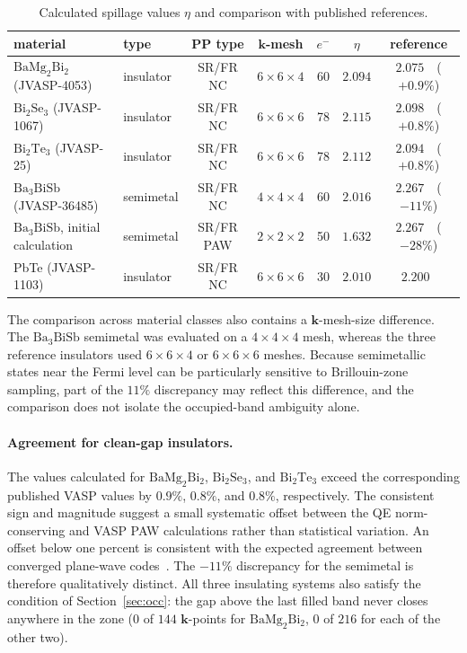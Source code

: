 \documentclass[11pt]{article}
\newcommand{\kk}{\mathbf{k}}
\newcommand{\bmb}{\mathrm{BaMg_2Bi_2}}
\newcommand{\bath}{\mathrm{Ba_3BiSb}}
\begin{document}
\begin{table}[htbp]
\centering
\caption{Calculated spillage values $\eta$ and comparison with published references.}\label{tab:materials}
\setlength{\tabcolsep}{5pt}
\begin{tabular}{@{}llccccc@{}}
\toprule
material & type & PP type & $\kk$-mesh & $e^-$ & $\eta$ & reference \\
\midrule
$\bmb$ (JVASP-4053) & insulator & SR/FR NC & $6\times6\times4$ & 60 & $\mathbf{2.094}$ & $2.075$\ \ ($+0.9\%$) \\
$\mathrm{Bi_2Se_3}$ (JVASP-1067) & insulator & SR/FR NC & $6\times6\times6$ & 78 & $2.115$ & $2.098$\ \ ($+0.8\%$) \\
$\mathrm{Bi_2Te_3}$ (JVASP-25) & insulator & SR/FR NC & $6\times6\times6$ & 78 & $2.112$ & $2.094$\ \ ($+0.8\%$) \\
$\bath$ (JVASP-36485) & semimetal & SR/FR NC & $4\times4\times4$ & 60 & $2.016$ & $2.267$\ \ ($-11\%$) \\
$\bath$, initial calculation & semimetal & SR/FR PAW & $2\times2\times2$ & 50 & $1.632$ & $2.267$\ \ ($-28\%$) \\
PbTe (JVASP-1103) & insulator & SR/FR NC & $6\times6\times6$ & 30 & $2.010$ & $2.200$~\cite{li2026} \\
\bottomrule
\end{tabular}
\end{table}

The comparison across material classes also contains a $\kk$-mesh-size difference. The $\bath$
semimetal was evaluated on a $4\times4\times4$ mesh, whereas the three reference insulators used
$6\times6\times4$ or $6\times6\times6$ meshes. Because semimetallic states near the Fermi level can
be particularly sensitive to Brillouin-zone sampling, part of the $11\%$ discrepancy may reflect
this difference, and the comparison does not isolate the occupied-band ambiguity alone.

\paragraph{Agreement for clean-gap insulators.} The values calculated for $\bmb$,
$\mathrm{Bi_2Se_3}$, and $\mathrm{Bi_2Te_3}$ exceed the corresponding published VASP values by
$0.9\%$, $0.8\%$, and $0.8\%$, respectively. The consistent sign and magnitude suggest a small
systematic offset between the QE norm-conserving and VASP PAW calculations rather than statistical
variation. An offset below one percent is consistent with the expected agreement between converged
plane-wave codes~\cite{lejaeghere2016}. The $-11\%$ discrepancy for the semimetal is therefore
qualitatively distinct. All three insulating systems also satisfy the condition of
Section~\ref{sec:occ}: the gap above the last filled band never closes anywhere in the zone
($0$ of $144$ $\kk$-points for $\bmb$, $0$ of $216$ for each of the other two).
\end{document}
